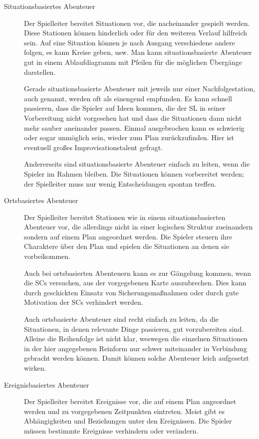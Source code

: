 \begin{description}
\item[Situationsbasiertes Abenteuer]
    Der Spielleiter bereitet Situationen vor, die nacheinander gespielt werden.
    Diese Stationen können hinderlich oder für den weiteren Verlauf hilfreich
    sein. Auf eine Situation können je nach Ausgang verschiedene andere folgen,
    es kann Kreise geben, usw. Man kann situationsbasierte Abenteuer gut in
    einem Ablaufdiagramm mit Pfeilen für die möglichen Übergänge darstellen.

    Gerade situationsbasierte Abenteuer mit jeweils nur einer Nachfolgestation,
    auch  genannt, werden oft als
    einengend empfunden.
    Es kann schnell passieren, dass die Spieler auf Ideen kommen, die der SL in
    seiner Vorbereitung nicht vorgesehen hat und dass die Situationen dann
    nicht mehr sauber aneinander passen. Einmal ausgebrochen kann es schwierig
    oder sogar unmöglich sein, wieder zum Plan zurückzufinden. Hier ist
    eventuell großes Improvisationstalent gefragt.

    Andererseits sind situationsbasierte Abenteuer einfach zu leiten, wenn die
    Spieler im Rahmen bleiben. Die Situationen können vorbereitet werden; der
    Spielleiter muss nur wenig Entscheidungen spontan treffen.

\item[Ortsbasiertes Abenteuer]
    Der Spielleiter bereitet Stationen wie in einem situationsbasierten
    Abenteuer vor, die allerdings nicht in einer logischen Struktur zueinandern
    sondern auf einem Plan angeordnet werden. Die Spieler steuern ihre
    Charaktere über den Plan und spielen die Situationen an denen sie
    vorbeikommen.

    Auch bei ortsbasierten Abenteuern kann es zur Gängelung kommen, wenn
    die SCs versuchen, aus der vorgegebenen Karte auszubrechen. Dies kann durch
    geschickten Einsatz von Sicherungsmaßnahmen oder durch gute Motivation der
    SCs verhindert werden.

    Auch ortsbasierte Abenteuer sind recht einfach zu leiten, da die
    Situationen, in denen relevante Dinge passieren, gut vorzubereiten sind.
    Alleine die Reihenfolge ist nicht klar, weswegen die einzelnen Situationen
    in der hier angegebenen Reinform nur schwer miteinander in Verbindung
    gebracht werden können. Damit können solche Abenteuer leich aufgesetzt
    wirken.

\item[Ereignisbasiertes Abenteuer]
    Der Spielleiter bereitet Ereignisse vor, die auf einem Plan angeordnet
    werden und zu vorgegebenen Zeitpunkten eintreten. Meist gibt es
    Abhängigkeiten und Beziehungen unter den Ereignissen. Die Spieler
    müssen bestimmte Ereignisse verhindern oder verändern. 


\end{description}
